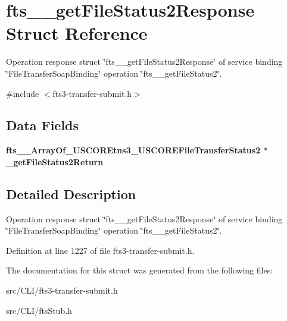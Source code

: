 \section{fts\_\-\_\-getFileStatus2Response Struct Reference}
\label{structfts____getFileStatus2Response}


Operation response struct \char`\"{}fts\_\-\_\-getFileStatus2Response\char`\"{} of service binding \char`\"{}FileTransferSoapBinding\char`\"{} operation \char`\"{}fts\_\-\_\-getFileStatus2\char`\"{}.  




{\ttfamily \#include $<$fts3-\/transfer-\/submit.h$>$}

\subsection*{Data Fields}
\begin{DoxyCompactItemize}
\item 
{\bf fts\_\-\_\-ArrayOf\_\-USCOREtns3\_\-USCOREFileTransferStatus2} $\ast$ {\bfseries \_\-getFileStatus2Return}\label{structfts____getFileStatus2Response_a6b2b703092c011b3ff464b726f896d81}

\end{DoxyCompactItemize}


\subsection{Detailed Description}
Operation response struct \char`\"{}fts\_\-\_\-getFileStatus2Response\char`\"{} of service binding \char`\"{}FileTransferSoapBinding\char`\"{} operation \char`\"{}fts\_\-\_\-getFileStatus2\char`\"{}. 

Definition at line 1227 of file fts3-\/transfer-\/submit.h.



The documentation for this struct was generated from the following files:\begin{DoxyCompactItemize}
\item 
src/CLI/fts3-\/transfer-\/submit.h\item 
src/CLI/ftsStub.h\end{DoxyCompactItemize}
